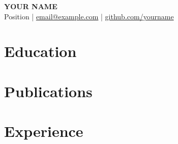 \documentclass[11pt, a4paper]{article}
\begin{document}
\begin{center}
  {\LARGE\bfseries YOUR NAME}\\[4pt]
  Position \quad|\quad
  \href{mailto:email@example.com}{email@example.com} \quad|\quad
  \href{https://github.com/}{github.com/yourname}
\end{center}

\section{Education}

\section{Publications}

\section{Experience}
\end{document}
